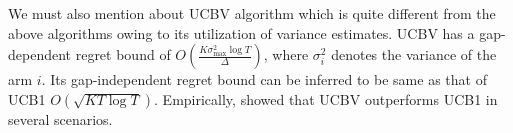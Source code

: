 	We must also mention about UCBV \cite{audibert2009exploration} algorithm which is quite different  from the above algorithms owing to its utilization of variance estimates. UCBV has a gap-dependent regret bound of $O\left(\frac{K\sigma_{\max}^{2}\log T}{\Delta}\right)$, where $\sigma_i^2$ denotes the variance of the arm $i$. Its gap-independent regret bound can be inferred to be same as that of UCB1 $O \left(\sqrt{KT\log T}\right)$. Empirically, \citet{audibert2009exploration} showed that UCBV outperforms UCB1 in several scenarios. 